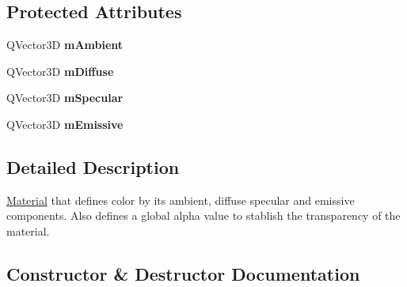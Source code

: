 \subsection*{Protected Attributes}
\begin{DoxyCompactItemize}
\item 
\mbox{\label{class_geometry_engine_1_1_geometry_material_1_1_alpha_color_material_a9957dbc5b4c23e3eff0b10ab1af7e608}} 
Q\+Vector3D {\bfseries m\+Ambient}
\item 
\mbox{\label{class_geometry_engine_1_1_geometry_material_1_1_alpha_color_material_a4981368ae313c85d51e95c5d96a80ba4}} 
Q\+Vector3D {\bfseries m\+Diffuse}
\item 
\mbox{\label{class_geometry_engine_1_1_geometry_material_1_1_alpha_color_material_ad02b0f6108cd0271af8a36283fb98be4}} 
Q\+Vector3D {\bfseries m\+Specular}
\item 
\mbox{\label{class_geometry_engine_1_1_geometry_material_1_1_alpha_color_material_afdd7cf49799cd590f1ec4dad96a75926}} 
Q\+Vector3D {\bfseries m\+Emissive}
\end{DoxyCompactItemize}


\subsection{Detailed Description}
\mbox{\hyperlink{class_geometry_engine_1_1_geometry_material_1_1_material}{Material}} that defines color by its ambient, diffuse specular and emissive components. Also defines a global alpha value to stablish the transparency of the material. 

\subsection{Constructor \& Destructor Documentation}
\mbox{\label{class_geometry_engine_1_1_geometry_material_1_1_alpha_color_material_ac735b5c0916ee378ab1615bf4d90813c}} 
